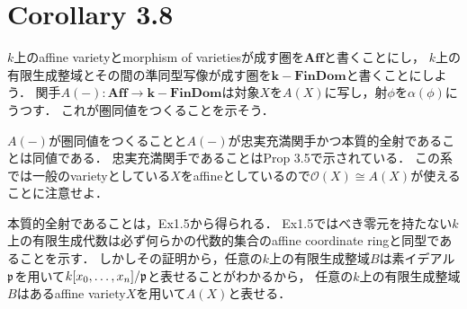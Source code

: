 \documentclass[a4paper]{jarticle}
\begin{document}
\section{Corollary 3.8}
    $k$上のaffine varietyとmorphism of varietiesが成す圏を$\mathbf{Aff}$と書くことにし，
    $k$上の有限生成整域とその間の準同型写像が成す圏を$\mathbf{k-FinDom}$と書くことにしよう．
    関手$A(-):\mathbf{Aff} \to \mathbf{k-FinDom}$は対象$X$を$A(X)$に写し，射$\phi$を$\alpha(\phi)$にうつす．
    これが圏同値をつくることを示そう．

    $A(-)$が圏同値をつくることと$A(-)$が忠実充満関手かつ本質的全射であることは同値である．
    忠実充満関手であることはProp 3.5で示されている．
    この系では一般のvarietyとしている$X$をaffineとしているので$\mathcal{O}(X) \cong A(X)$が使えることに注意せよ．

    本質的全射であることは，Ex1.5から得られる．
    Ex1.5ではべき零元を持たない$k$上の有限生成代数は必ず何らかの代数的集合のaffine coordinate ringと同型であることを示す．
    しかしその証明から，任意の$k$上の有限生成整域$B$は素イデアル$\mathfrak{p}$を用いて$k[x_0,\dots,x_n]/\mathfrak{p}$と表せることがわかるから，
    任意の$k$上の有限生成整域$B$はあるaffine variety$X$を用いて$A(X)$と表せる．
\end{document}
